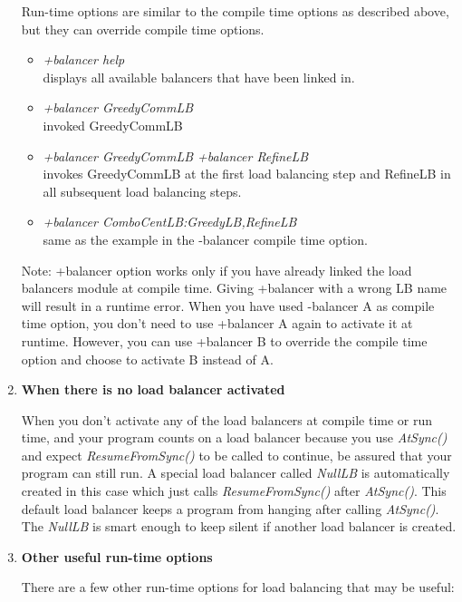 \begin{enumerate}
Run-time options are similar to the compile time options as described above,
but they can override compile time options.

\begin{itemize}
\item {\em +balancer help} \\
  displays all available balancers that have been linked in.
\item {\em +balancer GreedyCommLB} \\
  invoked GreedyCommLB
\item {\em +balancer GreedyCommLB +balancer RefineLB} \\
  invokes GreedyCommLB at the first load balancing step and RefineLB in all
subsequent load balancing steps.
\item {\em +balancer ComboCentLB:GreedyLB,RefineLB}  \\
  same as the example in the -balancer compile time option.
\end{itemize}

Note: +balancer option works only if you have already linked the load balancers module at compile time. 
Giving +balancer with a wrong LB name will result in a runtime error.
When you have used -balancer A as compile time option, you don't need to use 
+balancer A again to activate it at runtime. However, you can 
use +balancer B to override the compile time option and choose to
activate B instead of A.

\item {\bf When there is no load balancer activated}

When you don't activate any of the load balancers at compile time or run time, 
and your program counts on a load balancer because you use {\em AtSync()}
and expect {\em ResumeFromSync()} to be called to continue,
be assured that your program can still run. 
A special load balancer called {\em NullLB} is 
automatically created in this case which just
calls {\em ResumeFromSync()} after {\em AtSync()}. 
This default load balancer keeps a program from hanging after calling {\em AtSync()}.
The {\em NullLB} is smart enough to keep silent if another 
load balancer is created.

\item {\bf Other useful run-time options}

There are a few other run-time options for load balancing that may be useful:


\end{enumerate}

